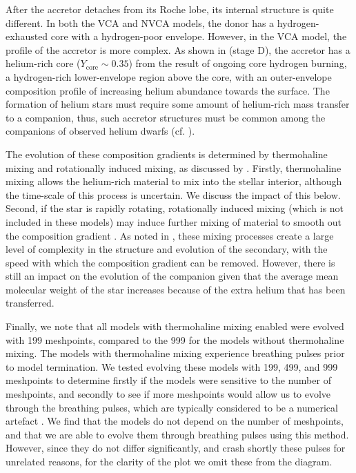 After the accretor detaches from its Roche lobe, its internal structure is quite different. In both the VCA and NVCA models, the donor has a hydrogen-exhausted core with a hydrogen-poor envelope. However, in the VCA model, the profile of the accretor is more complex. As shown in  (stage D), the accretor has a helium-rich core ($Y_\text{core}\sim 0.35$) from the result of ongoing core hydrogen burning, a hydrogen-rich lower-envelope region above the core, with an outer-envelope composition profile of increasing helium abundance towards the surface. The formation of helium stars must require some amount of helium-rich mass transfer to a companion, thus, such accretor structures must be common among the companions of observed helium dwarfs (cf. ).

The evolution of these composition gradients is determined by thermohaline mixing and rotationally induced mixing, as discussed by \citet{Renzo:2021}. Firstly, thermohaline mixing allows the helium-rich material to mix into the stellar interior, although the time-scale of this process is uncertain. We discuss the impact of this below. Second, if the star is rapidly rotating, rotationally induced mixing (which is not included in these models) may induce further mixing of material to smooth out the composition gradient \citep[e.g.][]{Eggenberger:2010}. As noted in \citet{Renzo:2021}, these mixing processes create a large level of complexity in the structure and evolution of the secondary, with the speed with which the composition gradient can be removed. However, there is still an impact on the evolution of the companion given that the average mean molecular weight of the star increases because of the extra helium that has been transferred.

Finally, we note that all models with thermohaline mixing enabled were evolved with 199 meshpoints, compared to the 999 for the models without thermohaline mixing. The models with thermohaline mixing experience breathing pulses prior to model termination. We tested evolving these models with 199, 499, and 999 meshpoints to determine firstly if the models were sensitive to the number of meshpoints, and secondly to see if more meshpoints would allow us to evolve through the breathing pulses, which are typically considered to be a numerical artefact \citep[e.g.,]{Castellani:1985, Stancliffe:2009}. We find that the models do not depend on the number of meshpoints, and that we are able to evolve them through breathing pulses using this method. However, since they do not differ significantly, and crash shortly these pulses for unrelated reasons, for the clarity of the plot we omit these from the diagram.

